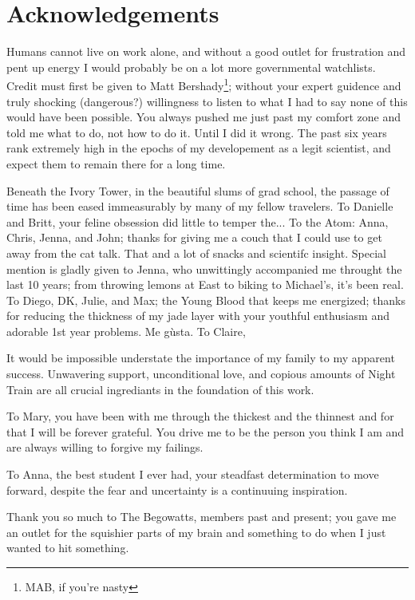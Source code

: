 \chapter{Acknowledgements}

Humans cannot live on work alone, and without a good outlet for frustration and pent up energy I would probably be on a lot more governmental watchlists. Credit must first be given to Matt Bershady\footnote{MAB, if you're nasty}; without your expert guidence and truly shocking (dangerous?) willingness to listen to what I had to say none of this would have been possible. You always pushed me just past my comfort zone and told me what to do, not how to do it. Until I did it wrong. The past six years rank extremely high in the epochs of my developement as a legit scientist, and expect them to remain there for a long time.

Beneath the Ivory Tower, in the beautiful slums of grad school, the passage of time has been eased immeasurably by many of my fellow travelers. To Danielle and Britt, your feline obsession did little to temper the... To the Atom: Anna, Chris, Jenna, and John; thanks for giving me a couch that I could use to get away from the cat talk. That and a lot of snacks and scientifc insight. Special mention is gladly given to Jenna, who unwittingly accompanied me throught the last 10 years; from throwing lemons at East to biking to Michael's, it's been real. To Diego, DK, Julie, and Max; the Young Blood that keeps me energized; thanks for reducing the thickness of my jade layer with your youthful enthusiasm and adorable 1st year problems. Me g\`usta. To Claire, 

It would be impossible understate the importance of my family to my apparent success. Unwavering support, unconditional love, and copious amounts of Night Train are all crucial ingrediants in the foundation of this work.

To Mary, you have been with me through the thickest and the thinnest and for that I will be forever grateful. You drive me to be the person you think I am and are always willing to forgive my failings.

To Anna, the best student I ever had, your steadfast determination to move forward, despite the fear and uncertainty is a continuuing inspiration.

Thank you so much to The Begowatts, members past and present; you gave me an outlet for the squishier parts of my brain and something to do when I just wanted to hit something.


